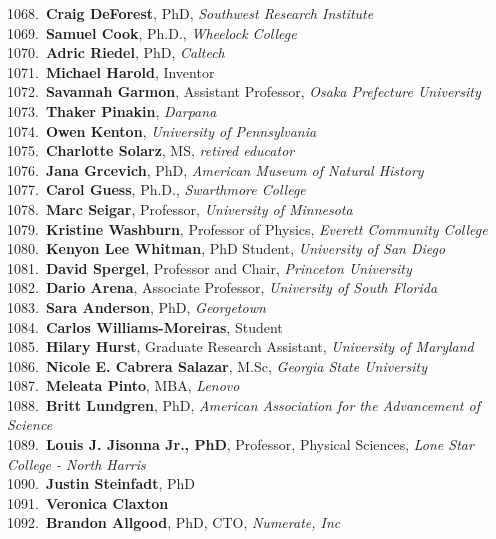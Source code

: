 1068.~{\bf Craig DeForest}, PhD, {\sl Southwest Research Institute} \\
1069.~{\bf Samuel Cook}, Ph.D., {\sl Wheelock College} \\
1070.~{\bf Adric Riedel}, PhD, {\sl Caltech} \\
1071.~{\bf Michael Harold}, Inventor \\
1072.~{\bf Savannah Garmon}, Assistant Professor, {\sl Osaka Prefecture University} \\
1073.~{\bf Thaker Pinakin}, {\sl Darpana } \\
1074.~{\bf Owen Kenton}, {\sl University of Pennsylvania} \\
1075.~{\bf Charlotte Solarz}, MS, {\sl retired educator} \\
1076.~{\bf Jana Grcevich}, PhD, {\sl American Museum of Natural History} \\
1077.~{\bf Carol Guess}, Ph.D., {\sl Swarthmore College} \\
1078.~{\bf Marc Seigar}, Professor, {\sl University of Minnesota} \\
1079.~{\bf Kristine Washburn}, Professor of Physics, {\sl Everett Community College} \\
1080.~{\bf Kenyon Lee Whitman}, PhD Student, {\sl University of San Diego} \\
1081.~{\bf David Spergel}, Professor and Chair, {\sl Princeton University} \\
1082.~{\bf Dario Arena}, Associate Professor, {\sl University of South Florida} \\
1083.~{\bf Sara Anderson}, PhD, {\sl Georgetown} \\
1084.~{\bf Carlos Williams-Moreiras}, Student \\
1085.~{\bf Hilary Hurst}, Graduate Research Assistant, {\sl University of Maryland } \\
1086.~{\bf Nicole E. Cabrera Salazar}, M.Sc, {\sl Georgia State University} \\
1087.~{\bf Meleata Pinto}, MBA, {\sl Lenovo} \\
1088.~{\bf Britt Lundgren}, PhD, {\sl American Association for the Advancement of Science} \\
1089.~{\bf Louis J. Jisonna Jr., PhD}, Professor, Physical Sciences, {\sl Lone Star College - North Harris} \\
1090.~{\bf Justin Steinfadt}, PhD \\
1091.~{\bf Veronica Claxton} \\
1092.~{\bf Brandon Allgood}, PhD, CTO, {\sl Numerate, Inc} \\
